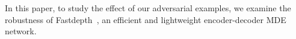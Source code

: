 \documentclass[10pt,twocolumn,letterpaper]{article}
\begin{document}
In this paper, to study the effect of our adversarial examples, 
we examine the robustness of Fastdepth~\cite{Wofk_2019_ICRA}, an
efficient and lightweight encoder-decoder MDE network.
\end{document}
